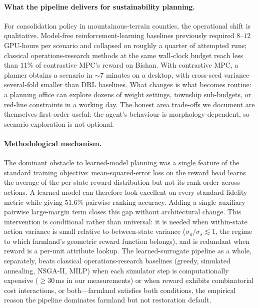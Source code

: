 \documentclass[11pt]{article}
\begin{document}
\paragraph{What the pipeline delivers for sustainability planning.} For consolidation policy in mountainous-terrain counties, the operational shift is qualitative. Model-free reinforcement-learning baselines previously required $8$--$12$ GPU-hours per scenario and collapsed on roughly a quarter of attempted runs; classical operations-research methods at the same wall-clock budget reach less than $11\%$ of contrastive MPC's reward on Bishan. With contrastive MPC, a planner obtains a scenario in $\sim$7 minutes on a desktop, with cross-seed variance several-fold smaller than DRL baselines. What changes is what becomes routine: a planning office can explore dozens of weight settings, township sub-budgets, or red-line constraints in a working day. The honest area trade-offs we document are themselves first-order useful: the agent's behaviour is morphology-dependent, so scenario exploration is not optional.

\paragraph{Methodological mechanism.} The dominant obstacle to learned-model planning was a single feature of the standard training objective: mean-squared-error loss on the reward head learns the average of the per-state reward distribution but not its rank order across actions. A learned model can therefore look excellent on every standard fidelity metric while giving $51.6\%$ pairwise ranking accuracy. Adding a single auxiliary pairwise large-margin term closes this gap without architectural change. This intervention is conditional rather than universal: it is needed when within-state action variance is small relative to between-state variance ($\sigma_a / \sigma_s \lesssim 1$, the regime to which farmland's geometric reward function belongs), and is redundant when reward is a per-unit attribute lookup. The learned-surrogate pipeline as a whole, separately, beats classical operations-research baselines (greedy, simulated annealing, NSGA-II, MILP) when each simulator step is computationally expensive ($\geq 30$\,ms in our measurements) or when reward exhibits combinatorial cost interactions, or both---farmland satisfies both conditions, the empirical reason the pipeline dominates farmland but not restoration default.
\end{document}
